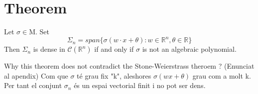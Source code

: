 \documentclass[../main.tex]{subfiles}
\begin{document}
\section{Theorem}
\begin{theorem} Let $ \sigma \in \text{M} $. Set
	$$ \Sigma_n = span\{\sigma(w\cdot x + \theta) : w\in \mathbb{R}^n, \theta \in \mathbb{R} \}$$
	Then $\Sigma_n$ is dense in $\mathcal{C}(\mathbb{R}^n)$ if and only if $\sigma$ is not an algebraic polynomial. 
	
\end{theorem}

Why this theorem does not contradict the Stone-Weierstrass theroem ? (Enunciat al apendix)  Com que $\sigma$ té grau fix "k", aleshores $\sigma (wx+\theta) $ grau com a molt k. Per tant el conjunt $\sigma_n$ és un espai vectorial finit i no pot ser dens. 
\end{document}

